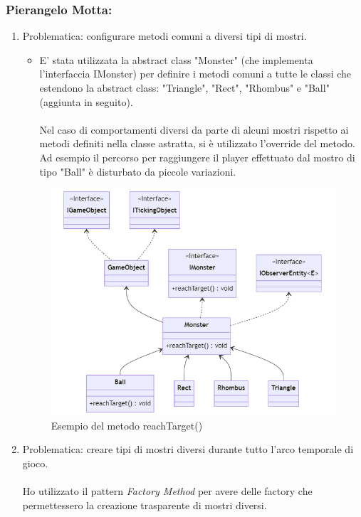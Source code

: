 \documentclass[a4paper,12pt]{report}
\begin{document}
\subsubsection*{Pierangelo Motta:}
%
\begin{enumerate}
\item Problematica: configurare metodi comuni a diversi tipi di mostri.
\begin{itemize}
	\item E' stata utilizzata la abstract class "Monster" (che implementa l'interfaccia IMonster) per definire i metodi comuni a tutte le classi che estendono la abstract class: "Triangle", "Rect", "Rhombus" e "Ball"(aggiunta in seguito).
	\\\\Nel caso di comportamenti diversi da parte di alcuni mostri rispetto ai metodi definiti nella classe astratta, si è utilizzato l'override del metodo. Ad esempio il percorso per raggiungere il player effettuato dal mostro di tipo "Ball" è disturbato da piccole variazioni.
\end{itemize}

\begin{figure}[H]
	\centering{}
\includegraphics[width=\textwidth]{img/MonsterReachTarget.png}
	\caption{Esempio del metodo reachTarget()}
\label{img:Generate Monsters}
\end{figure}

\item Problematica: creare tipi di mostri diversi durante tutto l'arco temporale di gioco.	
\paragraph*{}
Ho utilizzato il pattern \emph{Factory Method} per avere delle factory che permettessero la creazione trasparente di mostri diversi.


\end{enumerate}
\end{document}
